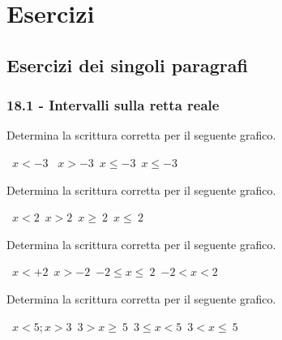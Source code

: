 
\section{Esercizi}
\subsection{Esercizi dei singoli paragrafi}
\subsubsection*{18.1 - Intervalli sulla retta reale}

\begin{esercizio}
 \label{ese:18.1}
 Determina la scrittura corretta per il seguente grafico.
 \begin{center}
  

 \boxA\quad~$x<-3$ \quad\boxB\quad~$x>-3$\quad\boxC\quad~$x\le -3$\quad\boxD\quad~$x\le -3$
 \end{center}

\end{esercizio}

\begin{esercizio}
 \label{ese:18.2}
 Determina la scrittura corretta per il seguente grafico.
  \begin{center}
  

\boxA\quad~$x<2$\quad\boxB\quad~$x>2$\quad\boxC\quad~$x\ge~2$\quad\boxD\quad~$x\le~2$
 \end{center}
\end{esercizio}

\begin{esercizio}
 \label{ese:18.3}
 Determina la scrittura corretta per il seguente grafico.
  \begin{center}
  

\boxA\quad~$x<+2$\quad\boxB\quad~$x>-2$\quad\boxC\quad~$-2\le x\le~2$\quad\boxD\quad~$-2<x<2$
 \end{center}
\end{esercizio}

\begin{esercizio}
 \label{ese:18.4}
 Determina la scrittura corretta per il seguente grafico.
  \begin{center}
  

  \boxA\quad~$x<5;x>3$\quad\boxB\quad~$3>x\ge~5$\quad\boxC\quad~$3\le x<5$\quad\boxD\quad~$3<x\le~5$
 \end{center}
  \end{esercizio}

